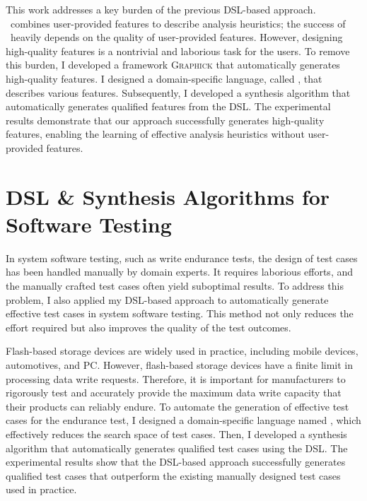 \documentclass[11pt]{article}
\newcommand{\myparagraph}[1]{\medskip\noindent{\it \textbf{#1.}}}
\begin{document}
\myparagraph{Graphick~\cite{Jeon20}}
%
This work addresses a key burden of the previous DSL-based approach. 
%
\DisjunctiveModel~combines user-provided features to describe analysis heuristics; the success of \DisjunctiveModel~heavily depends on the quality of user-provided features.
%
However, designing high-quality features is a nontrivial and laborious task for the users.
%
To remove this burden, I developed a framework \textsc{Graphick} that automatically generates high-quality features.
%
I designed a domain-specific language, called \FeatureLanguage, that describes various features.
%
Subsequently, I developed a synthesis algorithm that automatically generates qualified features from the DSL.
%
The experimental results demonstrate that our approach successfully generates high-quality features, enabling the learning of effective analysis heuristics without user-provided features.




\section{DSL \& Synthesis Algorithms for Software Testing}
%
In system software testing, such as write endurance tests, the design of test cases has been handled manually by domain experts. 
It requires laborious efforts, and the manually crafted test cases often yield suboptimal results.
%
To address this problem, I also applied my DSL-based approach to automatically generate effective test cases in system software testing.
%
This method not only reduces the effort required but also improves the quality of the test outcomes.




\myparagraph{ARES~\cite{ARES23}}
%
Flash-based storage devices are widely used in practice, including mobile devices, automotives, and PC. 
%
However, flash-based storage devices have a finite limit in processing data write requests.
%
Therefore, it is important for manufacturers to rigorously test and accurately provide the maximum data write capacity that their products can reliably endure.
%
To automate the generation of effective test cases for the endurance test, I designed a domain-specific language named \AbstractRelativeWritePattern, which effectively reduces the search space of test cases.
%
Then, I developed a synthesis algorithm that automatically generates qualified test cases using the DSL.
%
The experimental results show that the DSL-based approach successfully generates qualified test cases that outperform the existing manually designed test cases used in practice.
\end{document}
